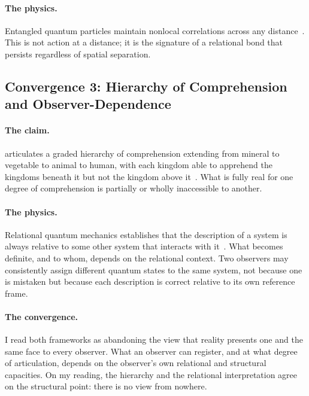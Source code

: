 \paragraph{The physics.}
Entangled quantum particles maintain nonlocal correlations across any distance~\citep{Aspect1982,Zeilinger2023Nobel}.
This is not action at a distance; it is the signature of a relational bond
that persists regardless of spatial separation.

\subsection{Convergence 3: Hierarchy of Comprehension and Observer-Dependence}

\paragraph{The \bahai claim.}
\AbdulBaha articulates a graded hierarchy of comprehension extending from
mineral to vegetable to animal to human, with each kingdom able to
apprehend the kingdoms beneath it but not the kingdom above it~\citep[Part 4]{SAQ}.
What is fully real for one degree of comprehension is partially or wholly
inaccessible to another.

\paragraph{The physics.}
Relational quantum mechanics establishes that the description of a system is
always relative to some other system that interacts with it~\citep{Rovelli1996}.
What becomes definite, and to whom, depends on the relational context.
Two observers may consistently assign different quantum states to the same
system, not because one is mistaken but because each description is correct
relative to its own reference frame.

\paragraph{The convergence.}
I read both frameworks as abandoning the view that reality presents one and the same face
to every observer.
What an observer can register, and at what degree of articulation, depends on
the observer's own relational and structural capacities.
On my reading, the \bahai hierarchy and the relational interpretation agree on the structural
point: there is no view from nowhere.


